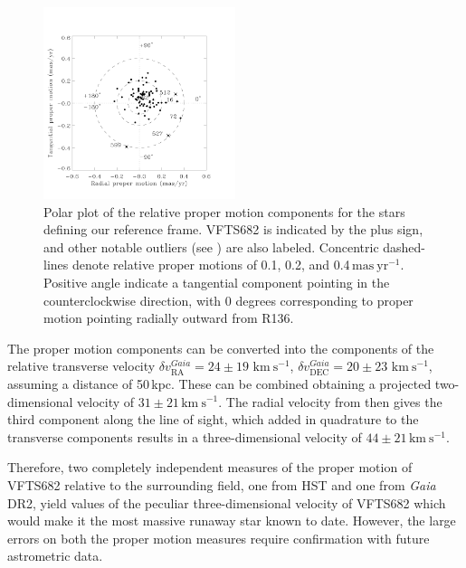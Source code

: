 \documentclass[a4paper,fleqn,usenatbib]{mnras}
\newcommand{\kms}{{\,\mathrm{km\ s^{-1}}}}
\DeclareRobustCommand{\Eqref}[1]{Eq.~\ref{#1}}
\begin{document}
\begin{figure}%
  \centering
  \includegraphics[width=0.5\textwidth]{figures/figure_polar_682-1.pdf}
  \caption{Polar plot of the relative proper motion components for the stars
    defining our reference frame. VFTS682 is indicated by the plus sign, and
    other notable outliers (see \citet{lennon:18}) are also labeled. Concentric dashed-lines denote relative proper motions of
    0.1, 0.2, and 0.4$\,\mathrm{mas\ yr^{-1}}$. Positive angle
    indicate a tangential component pointing in the counterclockwise
    direction, with 0 degrees corresponding to proper motion pointing
    radially outward from R136.
  }
  \label{fig:pm_polar}
\end{figure}



The proper motion components can be converted into
the components of the relative transverse velocity $\delta v_\mathrm{RA}^{Gaia}=24\pm19\,\kms$,
$\delta v_\mathrm{DEC}^{Gaia}=20\pm23\,\kms$, assuming a distance of
50\,kpc. These can be combined obtaining a projected two-dimensional
velocity of $31\pm21\kms$. %
The radial velocity from
\cite{bestenlehner:11} then gives the third component along
the line of sight, %
which added in quadrature to the transverse components results in a
three-dimensional velocity of $44 \pm 21\kms$.

Therefore, two completely independent measures of the proper motion of
VFTS682 relative to the surrounding field, one from HST and one from
\emph{Gaia} DR2, yield values of the peculiar three-dimensional
velocity of VFTS682 %
which would make it the most massive runaway star
known to date. However, the large errors on both the proper motion measures
require confirmation with future astrometric data. 
\end{document}
